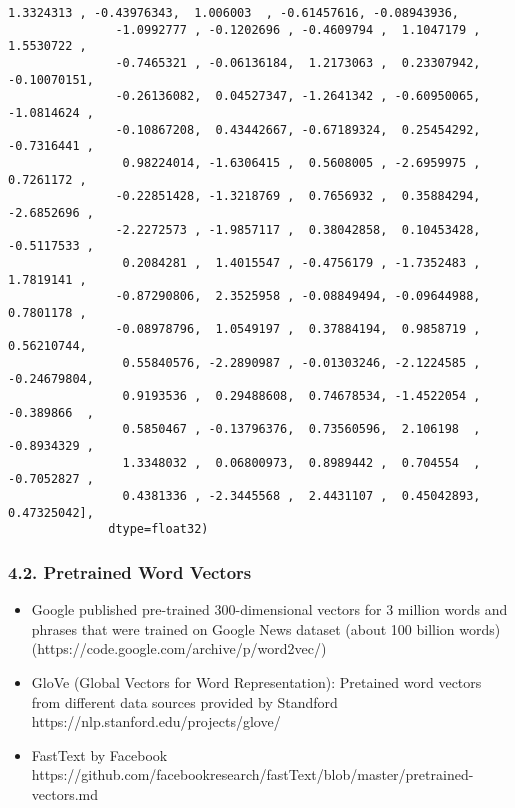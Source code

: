\documentclass[11pt]{article}
\providecommand{\tightlist}{%
      \setlength{\itemsep}{0pt}\setlength{\parskip}{0pt}}
\begin{document}
\begin{Verbatim}[commandchars=\\\{\}]
                1.3324313 , -0.43976343,  1.006003  , -0.61457616, -0.08943936,
               -1.0992777 , -0.1202696 , -0.4609794 ,  1.1047179 ,  1.5530722 ,
               -0.7465321 , -0.06136184,  1.2173063 ,  0.23307942, -0.10070151,
               -0.26136082,  0.04527347, -1.2641342 , -0.60950065, -1.0814624 ,
               -0.10867208,  0.43442667, -0.67189324,  0.25454292, -0.7316441 ,
                0.98224014, -1.6306415 ,  0.5608005 , -2.6959975 ,  0.7261172 ,
               -0.22851428, -1.3218769 ,  0.7656932 ,  0.35884294, -2.6852696 ,
               -2.2272573 , -1.9857117 ,  0.38042858,  0.10453428, -0.5117533 ,
                0.2084281 ,  1.4015547 , -0.4756179 , -1.7352483 ,  1.7819141 ,
               -0.87290806,  2.3525958 , -0.08849494, -0.09644988,  0.7801178 ,
               -0.08978796,  1.0549197 ,  0.37884194,  0.9858719 ,  0.56210744,
                0.55840576, -2.2890987 , -0.01303246, -2.1224585 , -0.24679804,
                0.9193536 ,  0.29488608,  0.74678534, -1.4522054 , -0.389866  ,
                0.5850467 , -0.13796376,  0.73560596,  2.106198  , -0.8934329 ,
                1.3348032 ,  0.06800973,  0.8989442 ,  0.704554  , -0.7052827 ,
                0.4381336 , -2.3445568 ,  2.4431107 ,  0.45042893,  0.47325042],
              dtype=float32)
\end{Verbatim}
            
    \hypertarget{pretrained-word-vectors}{%
\subsubsection{4.2. Pretrained Word
Vectors}\label{pretrained-word-vectors}}

\begin{itemize}
\tightlist
\item
  Google published pre-trained 300-dimensional vectors for 3 million
  words and phrases that were trained on Google News dataset (about 100
  billion words)(https://code.google.com/archive/p/word2vec/)
\item
  GloVe (Global Vectors for Word Representation): Pretained word vectors
  from different data sources provided by Standford
  https://nlp.stanford.edu/projects/glove/
\item
  FastText by Facebook
  https://github.com/facebookresearch/fastText/blob/master/pretrained-vectors.md
\end{itemize}
\end{document}
